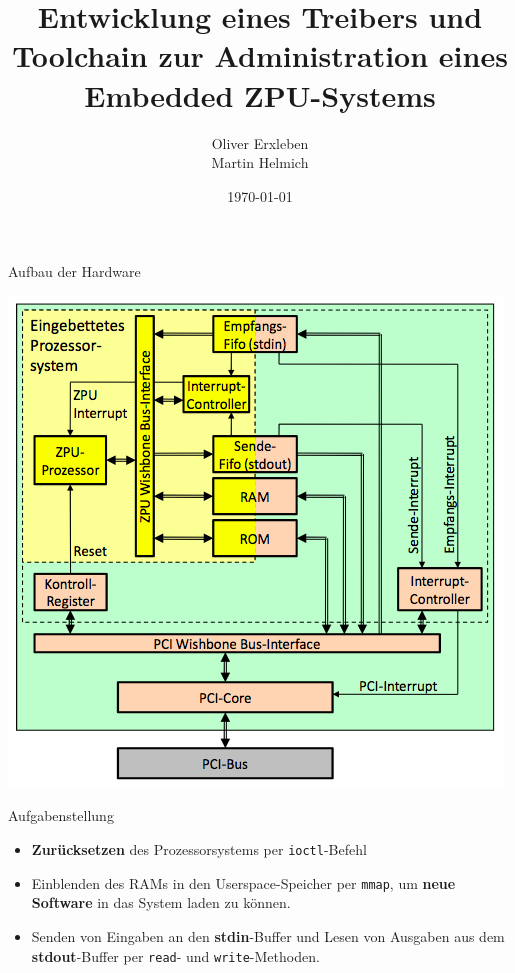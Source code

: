 \documentclass[10pt]{beamer}
\title{Entwicklung eines Treibers und Toolchain zur Administration eines Embedded ZPU-Systems}
\author{Oliver Erxleben\\Martin Helmich}
\institute{Hochschule Osnabrück}
\date{\today}
\begin{document}
	\frame{\titlepage}
	
	\begin{frame}{Aufbau der Hardware}
		\begin{center}
		\includegraphics[height=0.9\textheight]{images/zpu_architecture.png}
		\end{center}
	\end{frame}
	
	\begin{frame}{Aufgabenstellung}
		\begin{itemize}
			\item \textbf{Zurücksetzen} des Prozessorsystems per \texttt{ioctl}-Befehl
			\item Einblenden des RAMs in den Userspace-Speicher per \texttt{mmap}, um \textbf{neue Software} in das System laden zu können.
			\item Senden von Eingaben an den \textbf{stdin}-Buffer und Lesen von Ausgaben aus dem \textbf{stdout}-Buffer per \texttt{read}- und \texttt{write}-Methoden.
		\end{itemize}
	\end{frame}
	
\end{document}
